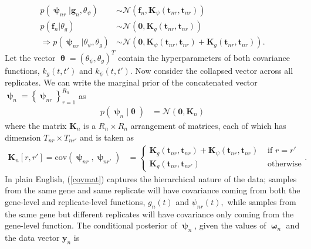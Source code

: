 \documentclass[11pt]{article}
\newcommand{\pN}{\mathcal{N}}
\newcommand{\1}{\mathbf{1}}
\newcommand{\0}{\mathbf{0}}
\newcommand{\f}{\mathbf{f}}
\newcommand{\K}{\mathbf{K}}
\newcommand{\g}{\mathbf{g}}
\newcommand{\y}{\mathbf{y}}
\begin{document}
%
%
%
\begin{align*}
	p(\bm{\uppsi}_{nr} | \g_{n}, \theta_{\psi}) &\sim \pN \left( \f_n, \K_{\psi}(\mathbf{t}_{nr}, \mathbf{t}_{nr}) \right) \\
	p(\f_n | \theta_{g})  &\sim \pN \left( \mathbf{0}, \K_g(\mathbf{t}_{nr}, \mathbf{t}_{nr}) \right) \\
	\Rightarrow p(\bm{\uppsi}_{nr} | \theta_{\psi}, \theta_g) &\sim \pN\left( \mathbf{0}, \K_{\psi}(\mathbf{t}_{nr}, \mathbf{t}_{nr}) + \K_{g}(\mathbf{t}_{nr}, \mathbf{t}_{nr}) \right).
\end{align*}
%
%
%
Let the vector $\bm{\uptheta} = (\theta_\psi, \theta_g)^T$ contain the hyperparameters of both covariance functions, $k_g(t, t')$ and $k_\psi(t, t')$. Now consider the collapsed vector across all replicates. We can write the marginal prior of the concatenated vector $\bm{\uppsi}_n = \left\{ \bm{\uppsi}_{nr} \right\}_{r=1}^{R_{n}}$ as 
%
%
%
\begin{align*}
	p(\bm{\uppsi}_n | \bm{\uptheta}) &= \pN(\mathbf{0}, \K_n)
\end{align*}
%
%
%
where the matrix $\K_n$ is a $R_n \times R_n$ arrangement of matrices, each of which has dimension $T_{nr} \times T_{nr'}$ and is taken as
%
%
%
\begin{align}
	\K_n[r, r'] = \text{cov}(\bm{\uppsi}_{nr}, \bm{\uppsi}_{nr'}) &= \begin{cases}
		\K_g(\mathbf{t}_{nr}, \mathbf{t}_{nr}) + \K_\psi(\mathbf{t}_{nr}, \mathbf{t}_{nr}) & \text{ if } r=r' \\
		\K_g(\mathbf{t}_{nr}, \mathbf{t}_{nr'}) & \text{ otherwise}
	\end{cases}. \label{covmat}
\end{align} 
%
%
%
In plain English, (\ref{covmat}) captures the hierarchical nature of the data; samples from the same gene and same replicate will have covariance coming from both the gene-level and replicate-level functions, $g_n(t)$ and $\psi_{nr}(t),$ while samples from the same gene but different replicates will have covariance only coming from the gene-level function. The conditional posterior of $\bm{\uppsi}_{n}$, given the values of $\bm{\upomega}_{n}$ and the data vector $\y_{n}$ is 
%
%
\end{document}
